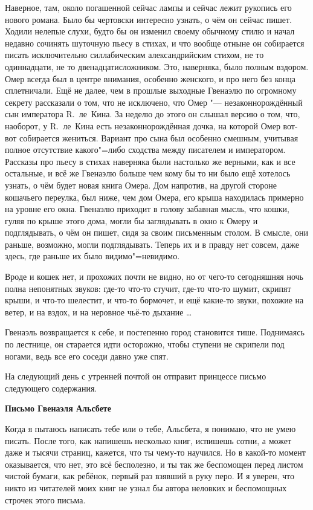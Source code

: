 Наверное, там, около погашенной сейчас лампы и сейчас лежит рукопись его нового
романа.
Было бы чертовски интересно узнать, о чём он сейчас пишет.
Ходили нелепые слухи, будто бы он изменил своему обычному стилю и начал недавно
сочинять шуточную пьесу в стихах, и что вообще отныне он собирается писать
исключительно силлабическим александрийским стихом, не то одиннадцати, не то
двенадцатисложником.
Это, наверняка, было полным вздором.
Омер всегда был в центре внимания, особенно женского, и про него без конца
сплетничали.
Ещё не далее, чем в прошлые выходные Гвенаэлю по огромному секрету рассказали о
том, что не исключено, что Омер "--- незаконнорождённый сын императора
R.~ле~Кина.
За неделю до этого он слышал версию о том, что, наоборот, у R.~ле~Кина есть
незаконнорождённая дочка, на которой Омер вот-вот собирается жениться.
Вариант про сына был особенно смешным, учитывая полное отсутствие какого"=либо
сходства между писателем и императором.
Рассказы про пьесу в стихах наверняка были настолько же верными, как и все
остальные, и всё же Гвенаэлю больше чем кому бы то ни было ещё хотелось узнать,
о чём будет новая книга Омера.
Дом напротив, на другой стороне кошачьего переулка, был ниже, чем дом Омера,
его крыша находилась примерно на уровне его окна.
Гвенаэлю приходит в голову забавная мысль, что кошки, гуляя по крыше этого дома,
могли бы заглядывать в окно к Омеру и подглядывать, о чём он пишет, сидя за своим
письменным столом.
В смысле, они раньше, возможно, могли подглядывать.
Теперь их и в правду нет совсем, даже здесь, где раньше их было видимо"=невидимо.

Вроде и кошек нет, и прохожих почти не видно, но от чего-то сегодняшняя ночь
полна непонятных звуков: где-то что-то стучит, где-то что-то шумит, скрипят
крыши, и что-то шелестит, и что-то бормочет, и ещё какие-то звуки, похожие на
ветер, и на вздох, и на неровное чьё-то дыхание \ldots

Гвенаэль возвращается к себе, и постепенно город становится тише.
Поднимаясь по лестнице, он старается идти осторожно, чтобы ступени не скрипели
под ногами, ведь все его соседи давно уже спят.

На следующий день с утренней почтой он отправит принцессе письмо следующего
содержания.

\medskip
\begin{center}
\textbf{Письмо Гвенаэля Альсбете}
\end{center}

\medskip
Когда я пытаюсь написать тебе или о тебе, Альсбета, я понимаю, что не умею
писать.
После того, как напишешь несколько книг, испишешь сотни, а может даже и тысячи
страниц, кажется, что ты чему-то научился.
Но в какой-то момент оказывается, что нет, это всё бесполезно, и ты так же
беспомощен перед листом чистой бумаги, как ребёнок, первый раз взявший в руку
перо.
И я уверен, что никто из читателей моих книг не узнал бы автора неловких и
беспомощных строчек этого письма.

